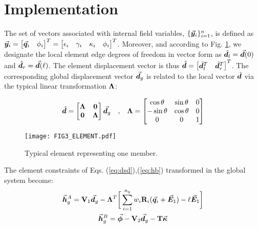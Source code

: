 \section{Implementation}\label{section:CH2-S4}

The set of vectors associated with internal field variables,
$\{\vec{\bm{y}}_i\}_{i=1}^n$, is defined as $\vec{\bm{y}}_i =\begin{bmatrix}
	\vec{\bm{q}}_i & \phi_i
\end{bmatrix}^T= \begin{bmatrix}
	\epsilon_i & \gamma_i & \kappa_i & \phi_i
\end{bmatrix}^T$. Moreover, and according to Fig. \ref{fig:fig3}, we designate
the local element edge degrees of freedom in vector form as
$\hat{\boldsymbol{d}}_l = \vec{\bm{d}}(0)$ and $\hat{\boldsymbol{d}}_r = \vec{\bm{d}}(\ell)$. The element 
displacement
vector is thus $\hat{\boldsymbol{d}} = \begin{bmatrix} \hat{\boldsymbol{d}}_l^T & \hat{\boldsymbol{d}}_r^T 
\end{bmatrix}^T$. The corresponding
global displacement vector $\vec{\bm{d}}_g$ is related to the local 
vector
$\hat{\boldsymbol{d}}$ via the typical linear transformation $\mathbf{\Lambda}$:  %

\begin{gather}
	\hat{\boldsymbol{d}} = \begin{bmatrix}
		\mathbf{\Lambda} & \mathbf{0}\\
		\mathbf{0} & \mathbf{\Lambda}
	\end{bmatrix}\vec{\bm{d}}_g
	\quad\text{,}\quad \mathbf{\Lambda}=\begin{bmatrix}
		\cos\theta & \sin\theta & 0\\
		-\sin\theta & \cos\theta & 0\\
		0 & 0 & 1
	\end{bmatrix}
\end{gather}

\begin{figure}[b]
	\centering
	\texttt{[image: FIG3\_ELEMENT.pdf]}
	\caption{Typical element representing one member.}
	\label{fig:fig3}
\end{figure}

\noindent The element constraints of Eqs. (\ref{eq:dsd}),(\ref{eq:hb})
transformed in the global system become:  %
\begin{subequations}
	\begin{gather}
		\vec{\bm{h}}^A_g = \mathbf{V}_1\vec{\bm{d}}_g - 
		\mathbf{\Lambda}^T\bigg[\sum_{i=1}^{n_q}
		w_i\mathbf{R}_i(\vec{\bm{q}}_i+\vec{\bm{E}}_1) - \ell\vec{\bm{E}}_1\bigg]
		\label{eq:impsd1}\\
		\vec{\bm{h}}^B_g = \vec{\bm{\phi}}-\mathbf{V}_2\vec{\bm{d}}_g - \mathbf{T}\vec{\bm{\kappa}}
		\label{eq:impsd2}
	\end{gather}
\end{subequations}

